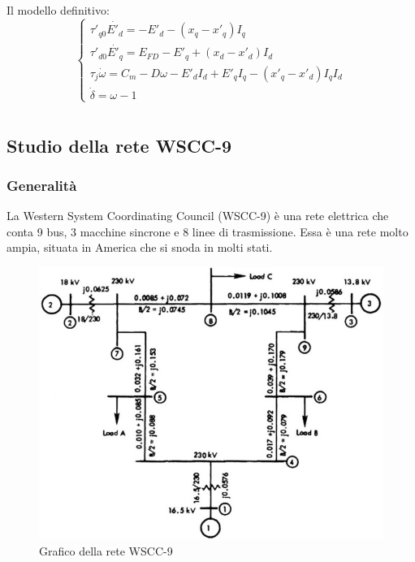 \documentclass[Lau,noexaminfo]{sapthesis}
\begin{document}
	Il modello definitivo:\\
	\[
	\begin{cases}
	\tau'_{q0} \dot{E'_d}=-E'_d-(x_q-x'_q)I_q\\
	\tau'_{d0}\dot{E'_q}=E_{FD}-E'_q+(x_d-x'_d)I_d\\
	\tau_j\dot{\omega}=C_m-D\omega-E'_dI_d+E'_qI_q-(x'_q-x'_d)I_qI_d\\
	\dot{\delta}=\omega-1
	\end{cases}
	\]
	\chapter{}
	\section{Studio della rete WSCC-9}
	\subsection{Generalità}
	La Western System Coordinating Council (WSCC-9) è una rete elettrica che conta 9 bus, 3 macchine sincrone e 8 linee di trasmissione. Essa è una rete molto ampia, situata in America che si snoda in molti stati.
	\begin{figure}
		\centering
		\includegraphics[height=0.35\textheight]{WSCC_line}
		\caption{Grafico della rete WSCC-9}
	\end{figure}
\end{document}
